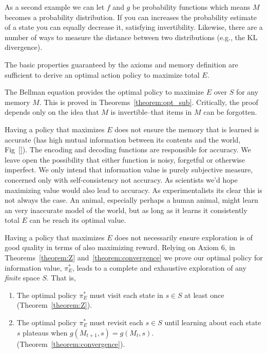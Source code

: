 \documentclass[9pt,twocolumn,twoside]{pnas-new}
\begin{document}
As a second example we can let $f$ and $g$ be probability functions which means $M$ becomes a probability distribution. If you can increases the probability estimate of a state you can equally decrease it, satisfying invertibility. Likewise, there are a number of ways to measure the distance between two distributions (e.g., the KL divergence).

The basic properties guaranteed by the axioms and memory definition are sufficient to derive an optimal action policy to maximize total $E$. 

The Bellman equation provides the optimal policy to maximize $E$ over $S$ for any memory $M$. This is proved in Theorems~\ref{theorem:opt_sub}. Critically, the proof depends only on the idea that $M$ is invertible--that items in $M$ can be forgotten. 


Having a policy that maximizes $E$ does not ensure the memory that is learned is accurate (has high mutual information between its contents and the world, Fig~\ref{}). The encoding and decoding functions are responsible for accuracy. We leave open the possibility that either function is noisy, forgetful or otherwise imperfect. We only intend that information value is purely subjective measure, concerned only with self-consistency not accuracy. As scientists we'd hope maximizing value would also lead to accuracy. As experimentalists its clear this is not always the case. An animal, especially perhaps a human animal, might learn an very inaccurate model of the world, but as long as it learns it consistently total $E$ can be reach its optimal value.

Having a policy that maximizes $E$ does not necessarily ensure exploration is of good quality in terms of also maximizing reward. Relying on Axiom 6, in Theorems~\ref{theorem:Z} and~\ref{theorem:convergence} we prove our optimal policy for information value, $\pi^*_E$, leads to a complete and exhaustive exploration of any \textit{finite} space $S$. That is,

\begin{enumerate}[noitemsep,wide=0pt,leftmargin=\dimexpr\labelwidth+2\labelsep\relax]
    \item The optimal policy $\pi^*_E$ must visit each state in $s \in S$ at least once (Theorem~\ref{theorem:Z}).
    \item The optimal policy $\pi^*_E$ must revisit each $s \in S$ until learning about each state $s$ plateaus when $g(M_{t+1}, s) = g(M_{t},s)$. (Theorem~\ref{theorem:convergence}).
\end{enumerate}
\end{document}
